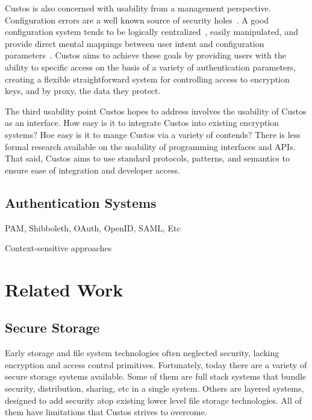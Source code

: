 Custos is also concerned with usability from a management
perspective. Configuration errors are a well known source of security
holes~\cite{Bishop1996, kerravala2002configuration}. A good
configuration system tends to be logically
centralized~\cite{Casado2007}, easily manipulated, and provide direct
mental mappings between user intent and configuration
parameters~\cite{norman2002design}. Custos aims to achieve these goals
by providing users with the ability to specific access on the basis of
a variety of authentication parameters, creating a flexible
straightforward system for controlling access to encryption keys, and
by proxy, the data they protect.

The third usability point Custos hopes to address involves the
usability of Custos as an interface. How easy is it to integrate
Custos into existing encryption systems? Hoe easy is it to mange
Custos via a variety of contends? There is less formal research
available on the usability of programming interfaces and APIs. That
said, Custos aims to use standard protocols, patterns, and semantics
to ensure ease of integration and developer access.

\subsection{Authentication Systems}

PAM, Shibboleth, OAuth, OpenID, SAML, Etc

Context-sensitive approaches

\section{Related Work}

\subsection{Secure Storage}

Early storage and file system technologies often neglected security,
lacking encryption and access control primitives. Fortunately, today
there are a variety of secure storage systems available. Some of them
are full stack systems that bundle security, distribution, sharing,
etc in a single system. Others are layered systems, designed to add
security atop existing lower level file storage technologies. All of
them have limitations that Custos strives to overcome.


